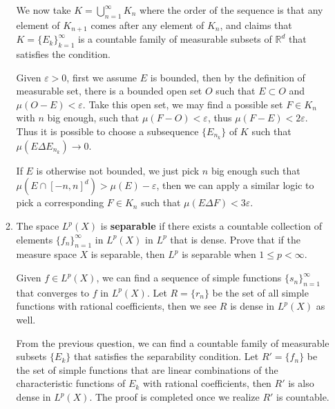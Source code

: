\documentclass{article}
\begin{document}
\begin{enumerate}
\begin{enumerate}
\begin{solution}
            We now take $K = \bigcup_{n=1}^\infty K_n$ where the order of the sequence is that any element of $K_{n+1}$ comes after any element of $K_n$, and claims that
            $K=\{E_k\}_{k=1}^\infty$ is a countable family of measurable subsets of $\mathbb R^d$ that satisfies the condition.

            Given $\varepsilon>0$, first we assume $E$ is bounded, then by the definition of measurable set, there is a bounded open set $O$ such that
            $E\subset O$ and $\mu(O-E)<\varepsilon$. Take this open set, we may find a possible set $F\in K_n$ with $n$ big enough, such that $\mu(F-O) < \varepsilon$,
            thus $\mu(F-E)<2\varepsilon$. Thus it is possible to choose a subsequence $\{E_{n_k}\}$ of $K$ such that $\mu(E\Delta E_{n_k})\to 0$.

            If $E$ is otherwise not bounded, we just pick $n$ big enough such that $\mu(E\cap [-n,n]^d) > \mu(E) - \varepsilon$, then we can apply a similar logic
            to pick a corresponding $F\in K_n$ such that $\mu(E\Delta F)< 3\varepsilon$.

        \end{solution}

        \item The space $L^p(X)$ is \textbf{separable} if there exists a countable collection of elements
        $\{f_n\}_{n=1}^\infty$ in $L^p(X)$ in $L^p$ that is dense.
        Prove that if the measure space $X$ is separable, then $L^p$ is separable when $1\leq p< \infty$. 

        \begin{solution}
            Given $f\in L^p(X)$, we can find a sequence of simple functions $\{s_n\}_{n=1}^\infty$ that converges to
            $f$ in $L^p(X)$. Let $R=\{r_n\}$ be the set of all simple functions with rational coefficients, then we see $R$ is
            dense in $L^p(X)$ as well.
            
            From the previous question, we can find a countable family of measurable subsets $\{E_k\}$ that satisfies the separability condition.
            Let $R'=\{f_n\}$ be the set of simple functions that are linear combinations of the characteristic functions of $E_k$ with rational coefficients,
            then $R'$ is also dense in $L^p(X)$. The proof is completed once we realize $R'$ is countable.
        \end{solution}
    \end{enumerate}
\end{enumerate}
\end{document}
